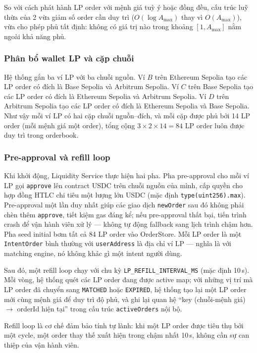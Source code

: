 So với cách phát hành LP order với mệnh giá tuỳ ý hoặc đồng đều, cấu trúc luỹ thừa của 2 vừa giảm số order cần duy trì ($O(\log A_{\max})$ thay vì $O(A_{\max})$), vừa cho phép phủ tất định: không có giá trị nào trong khoảng $[1, A_{\max}]$ nằm ngoài khả năng phủ.

\subsubsection{Phân bổ wallet LP và cặp chuỗi}

Hệ thống gắn ba ví LP với ba chuỗi nguồn. Ví $B$ trên Ethereum Sepolia tạo các LP order có đích là Base Sepolia và Arbitrum Sepolia. Ví $C$ trên Base Sepolia tạo các LP order có đích là Ethereum Sepolia và Arbitrum Sepolia. Ví $D$ trên Arbitrum Sepolia tạo các LP order có đích là Ethereum Sepolia và Base Sepolia. Như vậy mỗi ví LP có hai cặp chuỗi nguồn--đích, và mỗi cặp được phủ bởi 14 LP order (mỗi mệnh giá một order), tổng cộng $3 \times 2 \times 14 = 84$ LP order luôn được duy trì trong orderbook.

\subsubsection{Pre-approval và refill loop}

Khi khởi động, Liquidity Service thực hiện hai pha. Pha pre-approval cho mỗi ví LP gọi \texttt{approve} lên contract USDC trên chuỗi nguồn của mình, cấp quyền cho hợp đồng HTLC chi tiêu một lượng lớn USDC (mặc định \texttt{type(uint256).max}). Pre-approval một lần duy nhất giúp các giao dịch \texttt{newOrder} sau đó không phải chèn thêm \texttt{approve}, tiết kiệm gas đáng kể; nếu pre-approval thất bại, tiến trình crash để vận hành viên xử lý — không tự động fallback sang lịch trình chậm hơn. Pha seed initial bơm tất cả 84 LP order vào OrderStore. Mỗi LP order là một \texttt{IntentOrder} bình thường với \texttt{userAddress} là địa chỉ ví LP — nghĩa là với matching engine, nó không khác gì một intent người dùng.

Sau đó, một refill loop chạy với chu kỳ \texttt{LP\_REFILL\_INTERVAL\_MS} (mặc định 10\,s). Mỗi vòng, hệ thống quét các LP order đang được active map; với những vị trí mà LP order đã chuyển sang \texttt{MATCHED} hoặc \texttt{EXPIRED}, hệ thống tạo lại một LP order mới cùng mệnh giá để duy trì độ phủ, và ghi lại quan hệ ``key (chuỗi-mệnh giá) $\rightarrow$ orderId hiện tại'' trong cấu trúc \texttt{activeOrders} nội bộ.

Refill loop là cơ chế đảm bảo tính tự lành: khi một LP order được tiêu thụ bởi một cycle, một order thay thế xuất hiện trong chậm nhất 10\,s, không cần sự can thiệp của vận hành viên.

